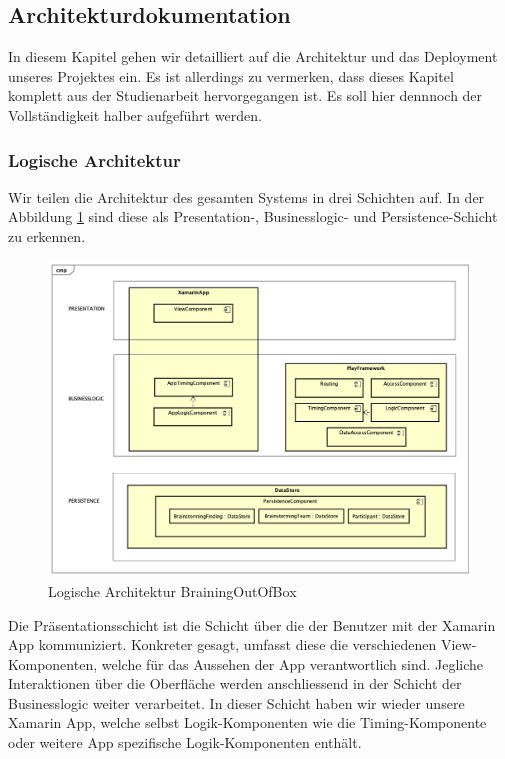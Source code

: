 \subsection{Architekturdokumentation}
\label{architektur}

In diesem Kapitel gehen wir detailliert auf die Architektur und das Deployment unseres Projektes ein. Es ist allerdings zu vermerken, dass dieses Kapitel komplett aus der Studienarbeit \cite{methode635-sa} hervorgegangen ist. Es soll hier dennnoch der Vollständigkeit halber aufgeführt werden.

\subsubsection{Logische Architektur}
Wir teilen die Architektur des gesamten Systems in drei Schichten auf. In der Abbildung \ref{fig:architektur-methode635} sind diese als Presentation-, Businesslogic- und Persistence-Schicht zu erkennen.

\begin{figure}[h]
	\centering
	\includegraphics[width=1\linewidth]{img/architektur/CD_Methode635}
	\caption{Logische Architektur BrainingOutOfBox}
	\label{fig:architektur-methode635}
\end{figure}

Die Präsentationsschicht ist die Schicht über die der Benutzer mit der Xamarin App kommuniziert. Konkreter gesagt, umfasst diese die verschiedenen View-Komponenten, welche für das Aussehen der App verantwortlich sind. Jegliche Interaktionen über die Oberfläche werden anschliessend in der Schicht der Businesslogic weiter verarbeitet. In dieser Schicht haben wir wieder unsere Xamarin App, welche selbst Logik-Komponenten wie die Timing-Komponente oder weitere App spezifische Logik-Komponenten enthält.

